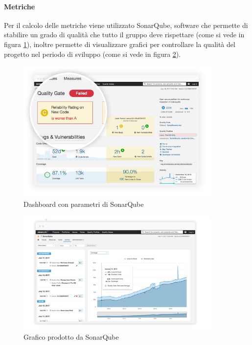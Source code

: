 			\paragraph{Metriche} \Spazio
			Per il calcolo delle metriche viene utilizzato SonarQube, software che permette di stabilire un grado di qualità che tutto il gruppo deve rispettare (come si vede in figura \ref{qualità}), inoltre permette di visualizzare grafici per controllare la qualità del progetto nel periodo di sviluppo (come si vede in figura \ref{graficobello}).
			\begin{figure}[h] 
				\centering 
				\includegraphics[width=0.9\textwidth]{images/enforce-quality-gate.png} 
				\caption{Dashboard con parametri di SonarQube}
				\label{qualità}
			\end{figure}
		    \begin{figure}[h]
		    	\centering 
		    	\includegraphics[width=0.9\textwidth]{images/project-history.png}
		    	\caption{Grafico prodotto da SonarQube}
		    	\label{graficobello} 
		    \end{figure}
			